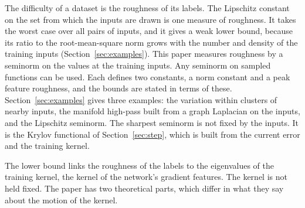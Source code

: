 \documentclass[11pt]{article}
\theoremstyle{definition}
\theoremstyle{remark}
\begin{document}
The difficulty of a dataset is the roughness of its labels.
The Lipschitz constant on the set from which the inputs are drawn is one measure of roughness.
It takes the worst case over all pairs of inputs, and it gives a weak lower bound, because its ratio to the root-mean-square norm grows with the number and density of the training inputs (Section~\ref{sec:examples}).
This paper measures roughness by a seminorm on the values at the training inputs.
Any seminorm on sampled functions can be used.
Each defines two constants, a norm constant and a peak feature roughness, and the bounds are stated in terms of these.
Section~\ref{sec:examples} gives three examples: the variation within clusters of nearby inputs, the manifold high-pass built from a graph Laplacian on the inputs, and the Lipschitz seminorm.
The sharpest seminorm is not fixed by the inputs.
It is the Krylov functional of Section~\ref{sec:step}, which is built from the current error and the training kernel.

The lower bound links the roughness of the labels to the eigenvalues of the training kernel, the kernel of the network's gradient features.
The kernel is not held fixed.
The paper has two theoretical parts, which differ in what they say about the motion of the kernel.
\end{document}
